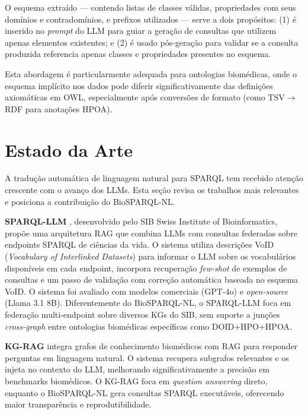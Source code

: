 \documentclass[12pt]{article}
\begin{document}
O esquema extra\'{i}do --- contendo listas de classes v\'{a}lidas, propriedades com seus dom\'{i}nios e contradom\'{i}nios, e prefixos utilizados --- serve a dois prop\'{o}sitos: (1) \'{e} inserido no \textit{prompt} do LLM para guiar a gera\c{c}\~{a}o de consultas que utilizem apenas elementos existentes; e (2) \'{e} usado p\'{o}s-gera\c{c}\~{a}o para validar se a consulta produzida referencia apenas classes e propriedades presentes no esquema.

Esta abordagem \'{e} particularmente adequada para ontologias biom\'{e}dicas, onde o esquema impl\'{i}cito nos dados pode diferir significativamente das defini\c{c}\~{o}es axiom\'{a}ticas em OWL, especialmente ap\'{o}s convers\~{o}es de formato (como TSV$\rightarrow$RDF para anota\c{c}\~{o}es HPOA).

\section{Estado da Arte}
\label{sec:estadoarte}

A tradu\c{c}\~{a}o autom\'{a}tica de linguagem natural para SPARQL tem recebido aten\c{c}\~{a}o crescente com o avan\c{c}o dos LLMs. Esta se\c{c}\~{a}o revisa os trabalhos mais relevantes e posiciona a contribui\c{c}\~{a}o do BioSPARQL-NL.

\textbf{SPARQL-LLM} \cite{emonet2024sparqlllm}, desenvolvido pelo SIB Swiss Institute of Bioinformatics, prop\~{o}e uma arquitetura RAG que combina LLMs com consultas federadas sobre endpoints SPARQL de ci\^{e}ncias da vida. O sistema utiliza descri\c{c}\~{o}es VoID (\textit{Vocabulary of Interlinked Datasets}) para informar o LLM sobre os vocabul\'{a}rios dispon\'{i}veis em cada endpoint, incorpora recupera\c{c}\~{a}o \textit{few-shot} de exemplos de consultas e um passo de valida\c{c}\~{a}o com corre\c{c}\~{a}o autom\'{a}tica baseada no esquema VoID. O sistema foi avaliado com modelos comerciais (GPT-4o) e \textit{open-source} (Llama 3.1 8B). Diferentemente do BioSPARQL-NL, o SPARQL-LLM foca em federa\c{c}\~{a}o multi-endpoint sobre diversos KGs do SIB, sem suporte a jun\c{c}\~{o}es \textit{cross-graph} entre ontologias biom\'{e}dicas espec\'{i}ficas como DOID+HPO+HPOA.

\textbf{KG-RAG} \cite{soman2024kgrag} integra grafos de conhecimento biom\'{e}dicos com RAG para responder perguntas em linguagem natural. O sistema recupera subgrafos relevantes e os injeta no contexto do LLM, melhorando significativamente a precis\~{a}o em benchmarks biom\'{e}dicos. O KG-RAG foca em \textit{question answering} direto, enquanto o BioSPARQL-NL gera consultas SPARQL execut\'{a}veis, oferecendo maior transparência e reprodutibilidade.
\end{document}
